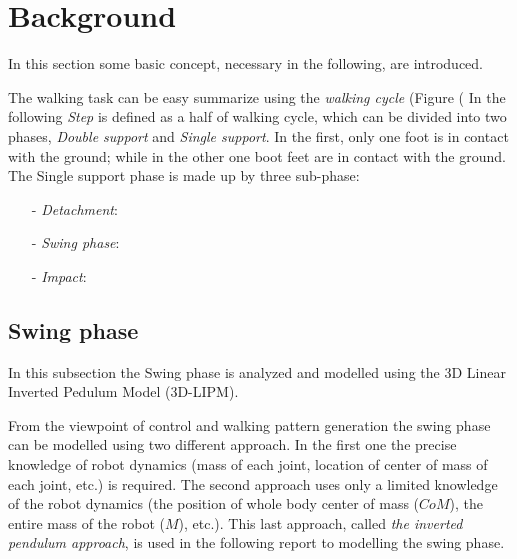 \section{Background}
In this section some basic concept, necessary in the following, are introduced.
\par
The walking task can be easy summarize using the \emph{walking cycle} (Figure (%
In the following \emph{Step} is defined as a half of walking cycle, which can be divided into two
phases, \emph{Double support} and \emph{Single support}.
In the first, only one foot is in contact with the ground; while in the other one boot feet are
in contact with the ground.
The Single support phase is made up by three sub-phase:
\begin{itemize}
\item[-] \emph{Detachment}:
\item[-] \emph{Swing phase}:
\item[-] \emph{Impact}:
\end{itemize}

\subsection{Swing phase}
In this subsection the Swing phase is analyzed and modelled using the 3D Linear Inverted
Pedulum Model (3D-LIPM).
\par
From the viewpoint of control and walking pattern generation the swing phase can be modelled using
two different approach. In the first one the precise knowledge of robot dynamics
(mass of each joint, location of center of mass of each joint, etc.) is required.
The second approach uses only a limited knowledge of the robot dynamics (the position of whole body center of mass ($CoM$), the entire mass of the robot ($M$), etc.). This last approach, called
\emph{the inverted pendulum approach}, is used in the following report to modelling the swing phase.
\newpage
